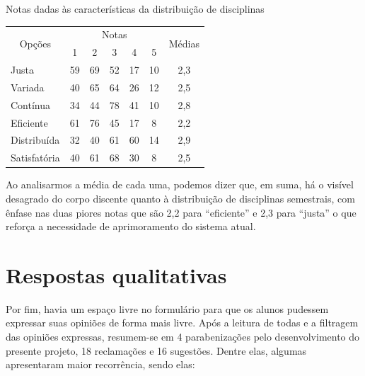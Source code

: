 \begin{apendicesenv}
  \begin{CenteredTable} \caption{Notas dadas às características da distribuição de disciplinas} \label{table:6.0-Opiniao}
    \begin{tabular}{| l | c c c c c | c |}
      \hline
      \multicolumn{1}{|c|}{\multirow{2}{*}{Opções}} &
      \multicolumn{5}{c|}{Notas}                    &
      \multicolumn{1}{c|}{\multirow{2}{*}{Médias}}
      \\
      \multicolumn{1}{|c|}{}                        &
      \multicolumn{1}{c|}{1}                        &
      \multicolumn{1}{c|}{2}                        &
      \multicolumn{1}{c|}{3}                        &
      \multicolumn{1}{c|}{4}                        &
      \multicolumn{1}{c|}{5}                        &
      \multicolumn{1}{c|}{}                                                        \\
      \hline
      Justa                                         & 59 & 69 & 52 & 17 & 10 & 2,3 \\
      Variada                                       & 40 & 65 & 64 & 26 & 12 & 2,5 \\
      Contínua                                      & 34 & 44 & 78 & 41 & 10 & 2,8 \\
      Eficiente                                     & 61 & 76 & 45 & 17 & 8  & 2,2 \\
      Distribuída                                   & 32 & 40 & 61 & 60 & 14 & 2,9 \\
      Satisfatória                                  & 40 & 61 & 68 & 30 & 8  & 2,5 \\
      \hline
    \end{tabular}
  \end{CenteredTable}

  Ao analisarmos a média de cada uma, podemos dizer que, em suma, há o visível desagrado do corpo discente quanto à distribuição de disciplinas semestrais, com ênfase nas duas piores notas que são 2,2 para ``eficiente'' e 2,3 para ``justa'' o que reforça a necessidade de aprimoramento do sistema atual.

  \section*{Respostas qualitativas} \label{sec:Respostas qualitativas}

  Por fim, havia um espaço livre no formulário para que os alunos pudessem expressar suas opiniões de forma mais livre. Após a leitura de todas e a filtragem das opiniões expressas, resumem-se em 4 parabenizações pelo desenvolvimento do presente projeto, 18 reclamações e 16 sugestões. Dentre elas, algumas apresentaram maior recorrência, sendo elas:


\end{apendicesenv}
